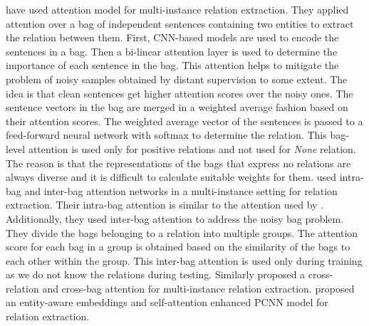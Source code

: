  have used attention model for multi-instance relation extraction. They applied attention over a bag of independent sentences containing two entities to extract the relation between them. First, CNN-based models are used to encode the sentences in a bag. Then a bi-linear attention layer is used to determine the importance of each sentence in the bag. This attention helps to mitigate the problem of noisy samples obtained by distant supervision to some extent. The idea is that clean sentences get higher attention scores over the noisy ones. The sentence vectors in the bag are merged in a weighted average fashion based on their attention scores. The weighted average vector of the sentences is passed to a feed-forward neural network with softmax to determine the relation. This bag-level attention is used only for positive relations and not used for {\em None} relation. The reason is that the representations of the bags that express no relations are always diverse and it is difficult to calculate suitable weights for them.
 used intra-bag and inter-bag attention networks in a multi-instance setting for relation extraction. Their intra-bag attention is similar to the attention used by . Additionally, they used inter-bag attention to address the noisy bag problem. They divide the bags belonging to a relation into multiple groups. The attention score for each bag in a group is obtained based on the similarity of the bags to each other within the group. This inter-bag attention is used only during training as we do not know the relations during testing. Similarly  proposed a cross-relation and cross-bag attention for multi-instance relation extraction.  proposed an entity-aware embeddings and self-attention  enhanced PCNN model for relation extraction.

